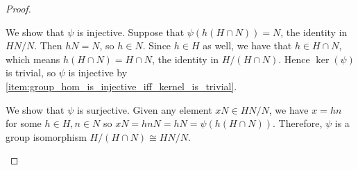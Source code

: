 \begin{proof}
\begin{enumerate}
        We show that $\psi$ is injective. Suppose that $\psi(h(H \cap N)) = N$, the identity in $HN/N$. Then $hN = N$, so $h \in N$. Since $h \in H$ as well, we have that $h \in H \cap N$, which means $h(H \cap N) = H \cap N$, the identity in $H/(H \cap N)$. Hence $\operatorname{ker}(\psi)$ is trivial, so $\psi$ is injective by \eqref{item:group_hom_is_injective_iff_kernel_is_trivial}.

        We show that $\psi$ is surjective. Given any element $xN \in HN/N$, we have $x = hn$ for some $h \in H, n \in N$ so $xN = hnN = hN = \psi(h(H \cap N))$.  Therefore, $\psi$ is a group isomorphism $H/(H \cap N) \cong HN/N$.
    \end{enumerate}

\end{proof}





